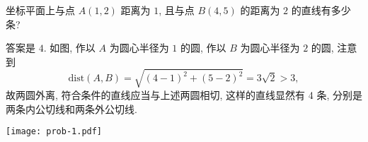 \begin{prob}
\label{prob:prob-1}
坐标平面上与点 $A(1, 2)$ 距离为 $1$, 且与点 $B(4, 5)$
的距离为 $2$ 的直线有多少条?
\end{prob}

\begin{soln}
答案是 $\boxed{4.}$
如图, 作以 $A$ 为圆心半径为 $1$ 的圆,
作以 $B$ 为圆心半径为 $2$ 的圆, 注意到
\[
\mathrm{dist}(A, B) = \sqrt{(4-1)^2 + (5-2)^2} = 3\sqrt{2} > 3,
\]
故两圆外离, 符合条件的直线应当与上述两圆相切,
这样的直线显然有 4 条, 分别是两条内公切线和两条外公切线.

\begin{center}
\texttt{[image: prob-1.pdf]}
\end{center}
\end{soln}
